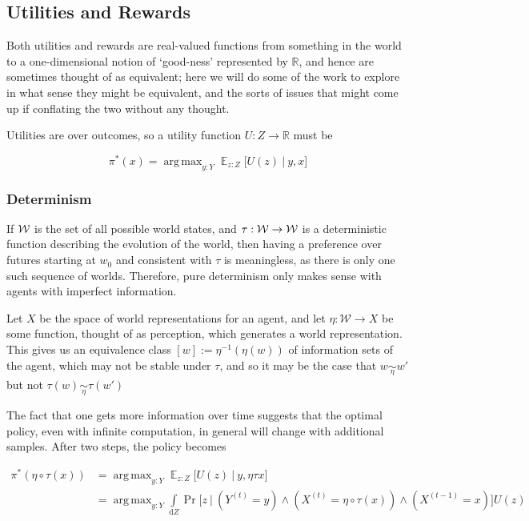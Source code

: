 \documentclass{book}
\DeclareMathOperator*{\argmax}{arg\,max}
\DeclareMathOperator*{\E}{\mathbb E}
\begin{document}
	
	

	
	\subsection{Utilities and Rewards}
	
	Both utilities and rewards are real-valued functions from something in the world to a one-dimensional notion of `good-ness' represented by $\mathbb R$, and hence are sometimes thought of as equivalent; here we will do some of the work to explore in what sense they might be equivalent, and the sorts of issues that might come up if conflating the two without any thought.
	
	Utilities are over outcomes, so a utility function $U : Z \to \mathbb R$ must be
	
	\[ \pi^*(x) = \argmax_{y: Y} \E_{z : Z} \Big[ U(z)~\Big|~ y,x\Big] \]
	
	\subsubsection{Determinism}
	If $\cal W$ is the set of all possible world states, and $\tau: \cal W \to W$ is a deterministic function describing the evolution of the world, then having a preference over futures starting at $w_0$ and consistent with $\tau$ is meaningless, as there is only one such sequence of worlds. Therefore, pure determinism only makes sense with agents with imperfect information. 
	
	Let $X$ be the space of world representations for an agent, and let $\eta: \mathcal W \to X$ be some function, thought of as perception, which generates a world representation. This gives us an equivalence class $[w] := \eta^{-1}(\eta(w))$ of information sets of the agent, which may not be stable under $\tau$, and so it may be the case that $w \underset\eta\sim w'$ but not $\tau(w) \underset\eta\sim \tau(w')$
	
	
	
	The fact that one gets more information over time suggests that the optimal policy, even with infinite computation, in general will change with additional samples. After two steps, the policy becomes
	
	\begin{align*}
		\pi^*(\eta\circ\tau (x)) &= \argmax_{y: Y} \E_{z : Z} \Big[ U(z)~\Big|~ y,\eta\tau x \Big]  \\
			&= \argmax_{y: Y} \int\limits_{\mathrm dZ} \Pr\Big[z~\Big|~\left(Y^{(t)} = y \right) \land \left(X^{(t)}= \eta \circ \tau (x)\right) \land \left(X^{(t-1)} = x \right) \Big] U(z)
	\end{align*}
		
\end{document}
